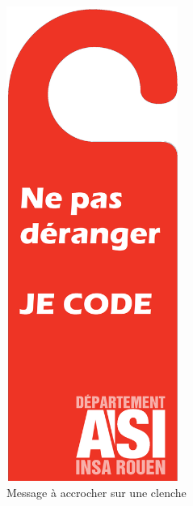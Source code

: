 		\begin{figure}
			\begin{center}
				\includegraphics[width=0.5\textwidth]{images/silence.png}
				\caption{\label{silence} Message à accrocher sur une clenche}
			\end{center}
		\end{figure}
